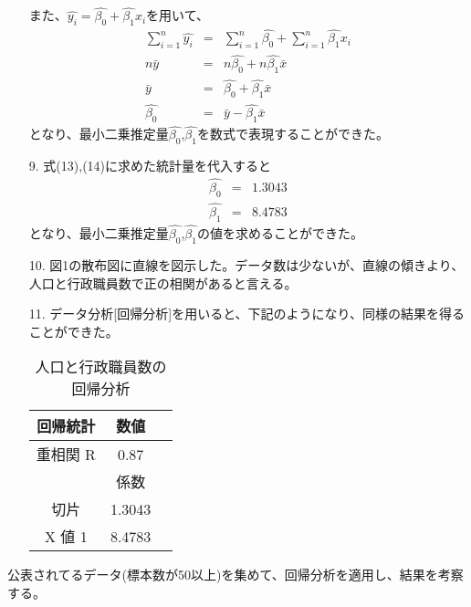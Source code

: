 \documentclass[12pt]{jarticle}
\begin{document}
\begin{itemize}
          \clearpage
          また、$\hat{y_i}=\hat{\beta_0}+\hat{\beta_1}x_i$を用いて、
          \begin{eqnarray}
              \sum_{i=1}^{n}\hat{y_i}&=&\sum_{i=1}^{n}\hat{\beta_0}+\sum_{i=1}^{n}\hat{\beta_1}x_i \nonumber \\
              n\bar{y}&=&n\hat{\beta_0}+n\hat{\beta_1}\bar{x} \nonumber \\
              \bar{y}&=&\hat{\beta_0}+\hat{\beta_1}\bar{x} \nonumber \\
              \hat{\beta_0}&=& \bar{y}-\hat{\beta_1}\bar{x}
          \end{eqnarray}
          となり、最小二乗推定量$\hat{\beta_0}$,$\hat{\beta_1}$を数式で表現することができた。
    \item [9.]式(13),(14)に求めた統計量を代入すると
          \begin{eqnarray}
              \hat{\beta_0}&=& 1.3043 \nonumber \\
              \hat{\beta_1}&=& 8.4783 \nonumber
          \end{eqnarray}
          となり、最小二乗推定量$\hat{\beta_0}$,$\hat{\beta_1}$の値を求めることができた。
    \item [10.]図1の散布図に直線を図示した。データ数は少ないが、直線の傾きより、人口と行政職員数で正の相関があると言える。
    \item [11.]データ分析[回帰分析]を用いると、下記のようになり、同様の結果を得ることができた。
          \begin{table}[htb]
              \begin{center}
                  \caption{人口と行政職員数の回帰分析}
                  \begin{tabular}{|c|c|c|} \hline
                      回帰統計 & 数値   \\ \hline
                      重相関 R & 0.87   \\
                      \hline  \hline
                               & 係数   \\\hline
                      切片     & 1.3043 \\ \hline
                      X 値 1   & 8.4783 \\ \hline
                  \end{tabular}
              \end{center}
          \end{table}
\end{itemize}

\begin{shadebox}
    公表されてるデータ(標本数が50以上)を集めて、回帰分析を適用し、結果を考察する。
\end{shadebox}
\end{document}
